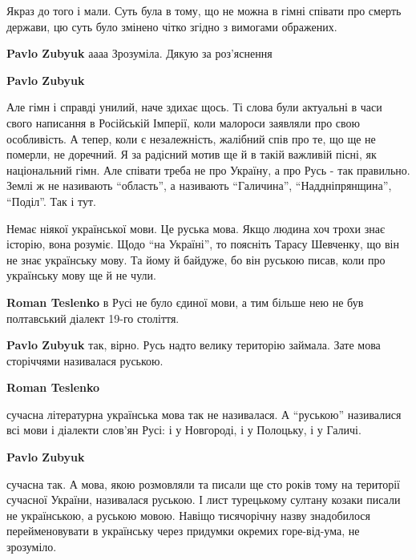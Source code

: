 \begin{itemize}
\begin{itemize}
Якраз до того і мали. Суть була в тому, що не можна в гімні співати про смерть
держави, цю суть було змінено чітко згідно з вимогами ображених.

\textbf{Pavlo Zubyuk} аааа
Зрозуміла. Дякую за роз’яснення

\textbf{Pavlo Zubyuk} 

Але гімн і справді унилий, наче здихає щось. Ті слова були актуальні в часи
свого написання в Російській Імперії, коли малороси заявляли про свою
особливість. А тепер, коли є незалежність, жалібний спів про те, що ще не
померли, не доречний. Я за радісний мотив ще й в такій важливій пісні, як
національний гімн. Але співати треба не про Україну, а про Русь - так
правильно. Землі ж не називають \enquote{область}, а називають \enquote{Галичина},
\enquote{Наддніпрянщина}, \enquote{Поділ}. Так і тут.

\end{itemize} %


Немає ніякої української мови. Це руська мова. Якщо людина хоч трохи знає
історію, вона розуміє. Щодо \enquote{на Україні}, то поясніть Тарасу Шевченку, що він
не знає українську мову. Та йому й байдуже, бо він руською писав, коли про
українську мову ще й не чули.

\begin{itemize} %
\textbf{Roman Teslenko} в Русі не було єдиної мови, а тим більше нею не був полтавський діалект 19-го століття.

\textbf{Pavlo Zubyuk} так, вірно. Русь надто велику територію займала. Зате мова сторіччями називалася руською.

\textbf{Roman Teslenko} 

сучасна літературна українська мова так не називалася. А \enquote{руською}
називалися всі мови і діалекти слов'ян Русі: і у Новгороді, і у Полоцьку, і у
Галичі.

\textbf{Pavlo Zubyuk} 

сучасна так. А мова, якою розмовляли та писали ще сто років тому на території
сучасної України, називалася руською. І лист турецькому султану козаки писали
не українською, а руською мовою. Навіщо тисячорічну назву знадобилося
перейменовувати в українську через придумки окремих горе-від-ума, не зрозуміло.

\end{itemize} %

\end{itemize} %
